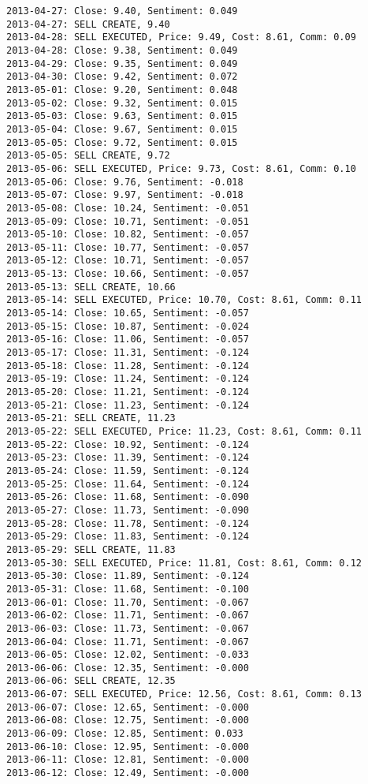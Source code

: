 \documentclass[11pt]{article}
\begin{document}
\begin{Verbatim}[commandchars=\\\{\}]
2013-04-27: Close: 9.40, Sentiment: 0.049
2013-04-27: SELL CREATE, 9.40
2013-04-28: SELL EXECUTED, Price: 9.49, Cost: 8.61, Comm: 0.09
2013-04-28: Close: 9.38, Sentiment: 0.049
2013-04-29: Close: 9.35, Sentiment: 0.049
2013-04-30: Close: 9.42, Sentiment: 0.072
2013-05-01: Close: 9.20, Sentiment: 0.048
2013-05-02: Close: 9.32, Sentiment: 0.015
2013-05-03: Close: 9.63, Sentiment: 0.015
2013-05-04: Close: 9.67, Sentiment: 0.015
2013-05-05: Close: 9.72, Sentiment: 0.015
2013-05-05: SELL CREATE, 9.72
2013-05-06: SELL EXECUTED, Price: 9.73, Cost: 8.61, Comm: 0.10
2013-05-06: Close: 9.76, Sentiment: -0.018
2013-05-07: Close: 9.97, Sentiment: -0.018
2013-05-08: Close: 10.24, Sentiment: -0.051
2013-05-09: Close: 10.71, Sentiment: -0.051
2013-05-10: Close: 10.82, Sentiment: -0.057
2013-05-11: Close: 10.77, Sentiment: -0.057
2013-05-12: Close: 10.71, Sentiment: -0.057
2013-05-13: Close: 10.66, Sentiment: -0.057
2013-05-13: SELL CREATE, 10.66
2013-05-14: SELL EXECUTED, Price: 10.70, Cost: 8.61, Comm: 0.11
2013-05-14: Close: 10.65, Sentiment: -0.057
2013-05-15: Close: 10.87, Sentiment: -0.024
2013-05-16: Close: 11.06, Sentiment: -0.057
2013-05-17: Close: 11.31, Sentiment: -0.124
2013-05-18: Close: 11.28, Sentiment: -0.124
2013-05-19: Close: 11.24, Sentiment: -0.124
2013-05-20: Close: 11.21, Sentiment: -0.124
2013-05-21: Close: 11.23, Sentiment: -0.124
2013-05-21: SELL CREATE, 11.23
2013-05-22: SELL EXECUTED, Price: 11.23, Cost: 8.61, Comm: 0.11
2013-05-22: Close: 10.92, Sentiment: -0.124
2013-05-23: Close: 11.39, Sentiment: -0.124
2013-05-24: Close: 11.59, Sentiment: -0.124
2013-05-25: Close: 11.64, Sentiment: -0.124
2013-05-26: Close: 11.68, Sentiment: -0.090
2013-05-27: Close: 11.73, Sentiment: -0.090
2013-05-28: Close: 11.78, Sentiment: -0.124
2013-05-29: Close: 11.83, Sentiment: -0.124
2013-05-29: SELL CREATE, 11.83
2013-05-30: SELL EXECUTED, Price: 11.81, Cost: 8.61, Comm: 0.12
2013-05-30: Close: 11.89, Sentiment: -0.124
2013-05-31: Close: 11.68, Sentiment: -0.100
2013-06-01: Close: 11.70, Sentiment: -0.067
2013-06-02: Close: 11.71, Sentiment: -0.067
2013-06-03: Close: 11.73, Sentiment: -0.067
2013-06-04: Close: 11.71, Sentiment: -0.067
2013-06-05: Close: 12.02, Sentiment: -0.033
2013-06-06: Close: 12.35, Sentiment: -0.000
2013-06-06: SELL CREATE, 12.35
2013-06-07: SELL EXECUTED, Price: 12.56, Cost: 8.61, Comm: 0.13
2013-06-07: Close: 12.65, Sentiment: -0.000
2013-06-08: Close: 12.75, Sentiment: -0.000
2013-06-09: Close: 12.85, Sentiment: 0.033
2013-06-10: Close: 12.95, Sentiment: -0.000
2013-06-11: Close: 12.81, Sentiment: -0.000
2013-06-12: Close: 12.49, Sentiment: -0.000

\end{Verbatim}
\end{document}
